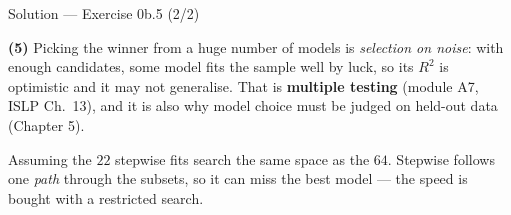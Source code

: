 \documentclass[aspectratio=169,11pt]{beamer}
\begin{document}
\begin{frame}{Solution --- Exercise 0b.5 (2/2)}
  \begin{solutionbox}
    \textbf{(5)} Picking the winner from a huge number of models is
    \emph{selection on noise}: with enough candidates, some model fits the
    sample well by luck, so its $R^2$ is optimistic and it may not generalise.
    That is \textbf{multiple testing} (module A7, ISLP Ch.\ 13), and it is also why model
    choice must be judged on held-out data (Chapter 5).
  \end{solutionbox}
  \begin{mistake}
    Assuming the $22$ stepwise fits search the same
    space as the $64$. Stepwise follows one \emph{path} through the subsets,
    so it can miss the best model --- the speed is bought with a restricted
    search.
  \end{mistake}
\end{frame}
\end{document}
